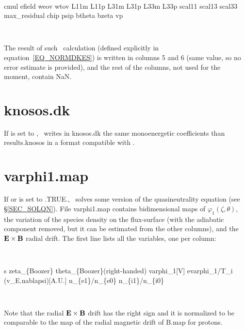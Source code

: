 \

{\ttfamily cmul efield weov wtov L11m L11p L31m L31p L33m L33p scal11 scal13 scal33}\\
{\ttfamily max\_residual chip psip btheta bzeta vp}

\

The result of such \KNOSOS~calculation (defined explicitly in equation~\ref{EQ_NORMDKES}) is written in columns 5 and 6 (same value, so no error estimate is provided), and the rest of the columns, not used for the moment, contain {\ttfamily NaN}.



\section{\ttfamily knosos.dk}

If  is set to \true, \KNOSOS~writes in {\ttfamily knosos.dk} the same monoenergetic coefficients than {\ttfamily results.knosos} in a format compatible with \NEOTRANSP. %



\section{{\ttfamily varphi1.map}}

If  or   is set to {\ttfamily .TRUE.}, \KNOSOS~solves some version of the quasineutrality equation  (see \S\ref{SEC_SOLQN}). File {\ttfamily varphi1.map}  contains bidimensional maps of $\varphi_1(\zeta,\theta)$, the variation of the species density on the flux-surface (with the adiabatic component removed, but it can be estimated from the other columns), and the $\mathbf{E}\times\mathbf{B}$ radial drift. The first line lists all the variables, one per column:

\

{\ttfamily s \tbl zeta\_\{Boozer\} \tbl theta\_\{Boozer\}(right-handed)  \tbl varphi\_1[V]  e\tbl varphi\_1/T\_i}\\
{\ttfamily (v\_E.\tbl nabla\tbl psi)[A.U.] n\_\{e1\}/n\_\{e0\} n\_\{i1\}/n\_\{i0\}}

\

Note that the radial $\mathbf{E}\times\mathbf{B}$ drift has the right sign and it is normalized to be comparable to the map of the radial magnetic drift of {\ttfamily B.map} for protons.


